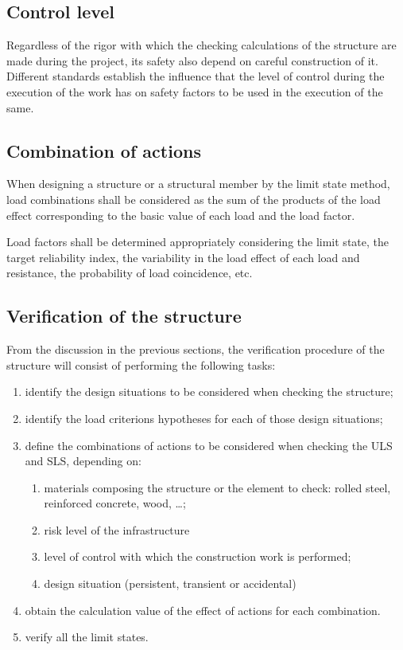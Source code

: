 \subsection{Control level}
Regardless of the rigor with which the checking calculations of the structure are made during the project, its safety also depend on careful construction of it. Different standards establish the influence that the level of control during the execution of the work has on safety factors to be used in the execution of the same.

\subsection{Combination of actions}
When designing a structure or a structural member by the limit state method, load combinations shall be considered as the sum of the products of the load effect corresponding to the basic value of each load and the load factor.

Load factors shall be determined appropriately considering the limit state, the target reliability index, the variability in the load effect of each load and resistance, the probability of load coincidence, etc.

\subsection{Verification of the structure}
From the discussion in the previous sections, the verification procedure of the structure will consist of performing the following tasks:

\begin{enumerate}
\item identify the design situations to be considered when checking the structure;
\item identify the load criterions hypotheses for each of those design situations;
\item define the combinations of actions to be considered when checking the ULS and SLS, depending on:

\begin{enumerate}
\item materials composing the structure or the element to check: rolled steel, reinforced concrete, wood, \ldots;
\item risk level of the infrastructure
\item level of control with which the construction work is performed;
\item design situation (persistent, transient or accidental)
\end{enumerate}
\item obtain the calculation value of the effect of actions for each combination.
\item verify all the limit states.
\end{enumerate}

